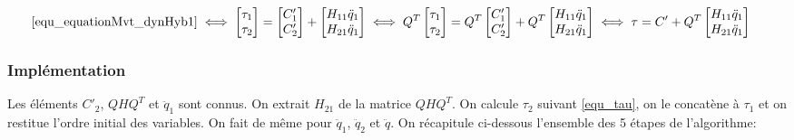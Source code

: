 \documentclass{report}
\begin{document}
\begin{align}
\eqref{equ_equationMvt_dynHyb1}
&\iff
\begin{bmatrix}
\tau_1 \\ 
\tau_2
\end{bmatrix} 
=
\begin{bmatrix}
C'_1 \\ 
C'_2
\end{bmatrix} 
+
\begin{bmatrix}
H_{11} \ddot{q}_1 \\ 
H_{21} \ddot{q}_1
\end{bmatrix} \iff
Q^T
\begin{bmatrix}
\tau_1 \\ 
\tau_2
\end{bmatrix} 
=
Q^T
\begin{bmatrix}
C'_1 \\ 
C'_2
\end{bmatrix} 
+
Q^T
\begin{bmatrix}
H_{11} \ddot{q}_1 \\ 
H_{21} \ddot{q}_1
\end{bmatrix} \iff \tau = C'
+
Q^T
\begin{bmatrix}
H_{11} \ddot{q}_1 \\ 
H_{21} \ddot{q}_1 \label{equ_tauIDdiff}
\end{bmatrix}
\end{align}


\subsubsection{Implémentation}

Les éléments $C'_2$, $QHQ^T$ et $\ddot{q}_1$ sont connus. On extrait $H_{21}$ de la matrice $QHQ^T$. On calcule $\tau_2$ suivant \eqref{equ_tau}, on le concatène à $\tau_1$ et on restitue l'ordre initial des variables. On fait de même pour $\ddot{q}_1$, $\ddot{q}_2$ et $\ddot{q}$.
On récapitule ci-dessous l'ensemble des 5 étapes de l'algorithme: \\
\end{document}
